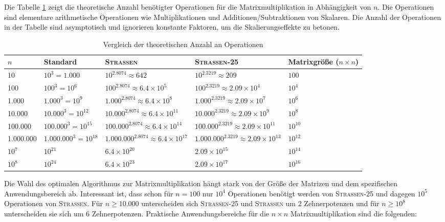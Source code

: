 \documentclass{scrartcl}
\begin{document}
Die Tabelle \ref{tab:operations-comparison} zeigt die theoretische Anzahl benötigter Operationen für die Matrixmultiplikation in Abhängigkeit von $n$. Die Operationen sind elementare arithmetische Operationen wie Multiplikationen und Additionen/Subtraktionen von Skalaren. Die Anzahl der Operationen in der Tabelle sind asymptotisch und ignorieren konstante Faktoren, um die Skalierungseffekte zu betonen.
\begin{table}[h]
	\centering
	\caption{Vergleich der theoretischen Anzahl an Operationen}
	\label{tab:operations-comparison}
	\renewcommand{\arraystretch}{1.5} %
	\begin{tabular}{m{1.5cm}|m{3cm}|m{3cm}|m{3cm}|m{2cm}}
		\hline
		$n$ & Standard & \textsc{Strassen} & \textsc{Strassen-25} & Matrixgröße ($n \times n$) \\
		\hline\hline
		10 & $10^3 = 1.000$ & $10^{2.8074} \approx 642$ & $10^{2.3219} \approx 209$ & $100$ \\
		\hline
		100 & $100^3 = 10^6$ & $100^{2.8074} \approx 6.4 \times 10^5$ & $100^{2.3219} \approx 2.09 \times 10^4$ & $10^4$ \\
		\hline
		1.000 & $1.000^3 = 10^9$ & $1.000^{2.8074} \approx 6.4 \times 10^8$ & $1.000^{2.3219} \approx 2.09 \times 10^7$ & $10^6$ \\
		\hline
		10.000 & $10.000^3 = 10^{12}$ & $10.000^{2.8074} \approx 6.4 \times 10^{11}$ & $10.000^{2.3219} \approx 2.09 \times 10^{9}$ & $10^8$ \\
		\hline
		100.000 & $100.000^3 = 10^{15}$ & $100.000^{2.8074} \approx 6.4 \times 10^{14}$ & $100.000^{2.3219} \approx 2.09 \times 10^{11}$ & $10^{10}$ \\
		\hline
		1.000.000 & $1.000.000^3 = 10^{18}$ & $1.000.000^{2.8074} \approx 6.4 \times 10^{17}$ & $1.000.000^{2.3219} \approx 2.09 \times 10^{13}$ & $10^{12}$ \\
		\hline
		$10^7$ & $10^{21}$ & $6.4 \times 10^{20}$ & $2.09 \times 10^{15}$ & $10^{14}$ \\
		\hline
		$10^8$ & $10^{24}$ & $6.4 \times 10^{23}$ & $2.09 \times 10^{17}$ & $10^{16}$ \\
		\hline
	\end{tabular}
\end{table}
Die Wahl des optimalen Algorithmus zur Matrixmultiplikation hängt stark von der Größe der Matrizen und dem spezifischen Anwendungsbereich ab. Interessant ist, dass schon für $n = 100$ nur $10^{4}$ Operationen benötigt werden von \textsc{Strassen-25} und dagegen $10^{5}$ Operationen von \textsc{Strassen}. Für $n \geq 10.000$ unterscheiden sich \textsc{Strassen-25} und \textsc{Strassen} um 2 Zehnerpotenzen und für $n \geq 10^8$ unterscheiden sie sich um 6 Zehnerpotenzen. Praktische Anwendungsbereiche für die $n \times n$ Matrixmultiplikation sind die folgenden:
\end{document}
